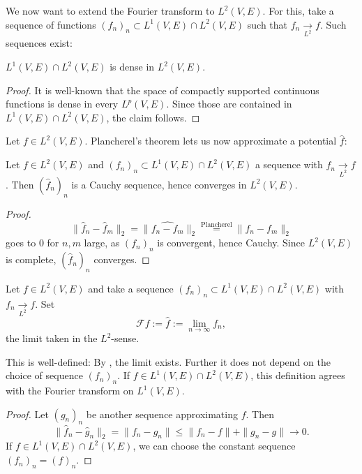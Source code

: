 We now want to extend the Fourier transform to $L^2(V,E)$. For this, take a sequence of functions $(f_n)_n\subset L^1(V,E)\cap L^2(V,E)$
such that $f_n\xrightarrow[L^2]{}f$. Such sequences exist:
\begin{lemma}
  \label{lem:L12-dense}
  \lean{}
  $L^1(V,E)\cap L^2(V,E)$ is dense in $L^2(V,E)$.
\end{lemma}
\begin{proof}
  It is well-known that the space of compactly supported continuous functions is dense in every $L^p(V,E)$.
  Since those are contained in $L^1(V,E)\cap L^2(V,E)$, the claim follows.
\end{proof}

Let $f\in L^2(V,E)$. Plancherel's theorem lets us now approximate a potential $\widehat f$:
\begin{lemma}
  \label{lem:fourier12-cauchy}
  \lean{}
  Let $f\in L^2(V,E)$ and $(f_n)_n\subset L^1(V,E)\cap L^2(V,E)$ a sequence with $f_n\xrightarrow[L^2]{}f$. Then $(\widehat f_n)_n$ is a Cauchy sequence,
  hence converges in $L^2(V,E)$.
\end{lemma}
\begin{proof}
  $$\|\widehat f_n-\widehat f_m\|_2=\|\widehat{f_n-f_m}\|_2\overset{\text{Plancherel}}=\|f_n-f_m\|_2$$ goes to $0$ for $n,m$ large, as $(f_n)_n$ is
  convergent, hence Cauchy. Since $L^2(V,E)$ is complete, $(\widehat f_n)_n$ converges.
\end{proof}
\begin{definition}
  \label{def:fourier-L2}
  \lean{}
  Let $f\in L^2(V,E)$ and take a sequence $(f_n)_n\subset L^1(V,E)\cap L^2(V,E)$ with $f_n\xrightarrow[L^2]{}f$. Set
  $$\mathcal Ff:=\widehat f:=\lim_{n\to\infty}\widehat{f_n},$$ the limit taken in the $L^2$-sense.
\end{definition}
\begin{lemma}
  \label{lem:fourier2-welldef}
  \lean{}
  This is well-defined: By , the limit exists. Further it does not depend
  on the choice of sequence $(f_n)_n$. If $f\in L^1(V,E)\cap L^2(V,E)$, this definition agrees with
  the Fourier transform on $L^1(V,E)$.
\end{lemma}
\begin{proof}
  Let $(g_n)_n$ be another sequence approximating $f$. Then
  $$\|\widehat f_n-\widehat g_n\|_2=\|f_n-g_n\|\leq\|f_n-f\|+\|g_n-g\|\to0.$$
  If $f\in L^1(V,E)\cap L^2(V,E)$, we can choose the constant sequence $(f_n)_n=(f)_n$.
\end{proof}

